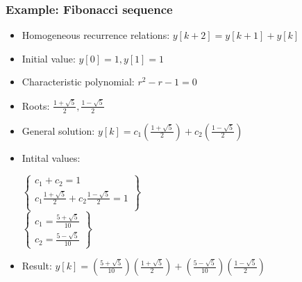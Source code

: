 \begin{frame}
	\frametitle{Example: Fibonacci sequence}
	\begin{example}
		\begin{itemize}
			\setlength\itemsep{0em}
			\item Homogeneous recurrence relations: $y[k+2] = y[k+1] + y[k]$
			\item Initial value: $y[0]=1, y[1]= 1$
			\item Characteristic polynomial: $r^2 - r - 1=0$ 
			\item Roots: $\frac{1+\sqrt{5}}{2}, \frac{1-\sqrt{5}}{2}$
			\item General solution: $y[k] = c_1(\frac{1+\sqrt{5}}{2}) + c_2(\frac{1-\sqrt{5}}{2})$
			\item Intital values: 
			\begin{center}
				$
				\begin{Bmatrix}
				c_1+ c_2 = 1\\
				c_1 \frac{1+\sqrt{5}}{2} + c_2 \frac{1-\sqrt{5}}{2} = 1  \\
				\end{Bmatrix}
				$\\
				$
				\begin{Bmatrix}
				c_1 = \frac{5+\sqrt{5}}{10}  \\
				c_2 = \frac{5-\sqrt{5}}{10}
				\end{Bmatrix}
				$\\
			\end{center}
			\item Result: $y[k] =  (\frac{5+\sqrt{5}}{10})(\frac{1+\sqrt{5}}{2}) +(\frac{5-\sqrt{5}}{10}) (\frac{1-\sqrt{5}}{2})$
		\end{itemize}
	\end{example}
\end{frame}

